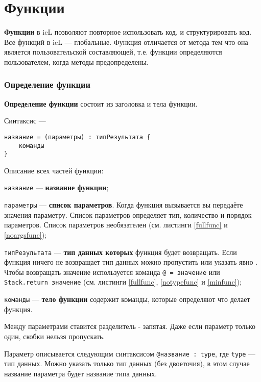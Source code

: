 \section{Функции}

{\bf Функции} в icL позволяют повторное использовать код, и структурировать код. Все функций в icL — глобальные. Функция отличается от метода тем что она является пользовательской составляющей, т.е. функции определяются пользователем, когда методы предопределены.

\subsubsection{Определение функции}

{\bf Определение функции} состоит из заголовка и тела функции.

\noindent Синтаксис —
\begin{verbatim}
название = (параметры) : типРезультата {
	команды
}
\end{verbatim}

Описание всех частей функции:
\begin{icItems}
\item
	\texttt{название} — {\bf название функции};
\item
	\texttt{параметры} — {\bf список параметров}. Когда функция вызывается вы передаёте значения параметру. Список параметров определяет тип, количество и порядок параметров. Список параметров необязателен (см. листинги \ref{fullfunc} и \ref{noargsfunc});
\item
	\texttt{типРезультата} — {\bf тип данных которых} функция будет возвращать. Если функция ничего не возвращает тип данных можно пропустить или указать явно \void{}. Чтобы возвращать значение используется команда \texttt{@ = значение} или \texttt{Stack.return значение} (см. листинги \ref{fullfunc}, \ref{notypefunc} и \ref{minfunc});
\item
	\texttt{команды} — {\bf тело функции} содержит команды, которые определяют что делает функция.
\end{icItems}

Между параметрами ставится разделитель - запятая. Даже если параметр только один, скобки нельзя пропускать.

Параметр описывается следующим синтаксисом \texttt{@название : type}, где \texttt{type} — тип данных. Можно указать только тип данных (без двоеточия), в этом случае название параметра будет название типа данных.

